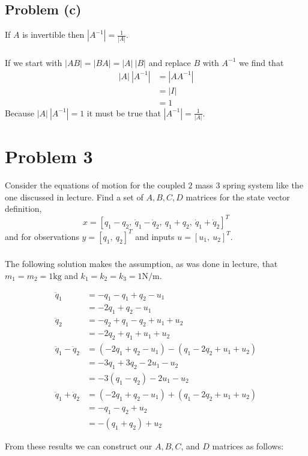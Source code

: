 \documentclass[11pt]{article}
\begin{document}
\subsection*{Problem (c)}
If $A$ is invertible then $|A^{-1}| = \frac{1}{|A|}$.
\subparagraph*{}
If we start with $|AB| = |BA| = |A|\ |B|$ and replace $B$ with $A^{-1}$ we find that 
\begin{align*}
	|A|\ |A^{-1}| &= |AA^{-1}| \\
	&= |I| \\
	&= 1
\end{align*}
Because $|A|\ |A^{-1}| = 1$ it must be true that $|A^{-1}| = \frac{1}{|A|}$. 

\section{Problem 3}
Consider the equations of motion for the coupled $2$ mass $3$ spring system like the one discussed in lecture. Find a set of $A,B,C,D$ matrices for the state vector definition,
\begin{equation*}
	x = [q_1-q_2,\ \dot{q}_1-\dot{q}_2,\ q_1+q_2,\ \dot{q}_1+\dot{q}_2]^T 
\end{equation*}
and for observations $y=[q_1,\ q_2]^T$ and inputs $u=[u_1,\ u_2]^T$.

\subparagraph{}
The following solution makes the assumption, as was done in lecture, that $m_1 = m_2 = 1\text{kg}$ and $k_1 = k_2 = k_3 = 1\text{N/m}$.

\begin{align*}
	\ddot{q}_1 &= -q_1 - q_1 + q_2 - u_1 \\
	&= -2q_1 + q_2 - u_1 \\
	\ddot{q}_2 &= -q_2 + q_1 - q_2 + u_1 + u_2 \\
	&= -2q_2 + q_1 + u_1 + u_2 \\
	\ddot{q}_1-\ddot{q}_2 &= (-2q_1+q_2-u_1) - (q_1-2q_2+u_1+u_2) \\
	&= -3q_1 + 3q_2 - 2u_1 - u_2 \\
	&= -3(q_1 - q_2) -2u_1 - u_2 \\
	\ddot{q}_1+\ddot{q}_2 &= (-2q_1+q_2-u_1) + (q_1-2q_2+u_1+u_2) \\
	&= -q_1 - q_2 + u_2 \\
	&= -(q_1 + q_2) + u_2 
\end{align*}

From these results we can construct our $A,B,C$, and $D$ matrices as follows:
\end{document}
